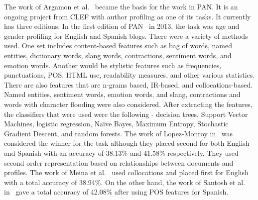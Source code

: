 \documentclass[a4paper]{llncs}
\begin{document}
The work of Argamon et al.~\cite{argamon2009automatically} became the basis for the work in PAN. It is an ongoing project from CLEF with author profiling as one of its tasks. It currently has three editions. In the first edition of PAN~\cite{rangel2013overview} in 2013, the task  was age and gender profiling for English and Spanish blogs. There were a variety of methods used. One set includes content-based features such as bag of words, named entities, dictionary words, slang words, contractions, sentiment words, and emotion words. Another would be stylistic features such as frequencies, punctuations, POS, HTML use, readability measures, and other various statistics. There are also features that are n-grams based, IR-based, and collocations-based. Named entities, sentiment words, emotion words, and slang, contractions and words with character flooding were also considered. After extracting the features, the classifiers that were used were the following - decision trees, Support Vector Machines, logistic regression, Naïve Bayes, Maximum Entropy, Stochastic Gradient Descent, and random forests. The work of Lopez-Monroy in~\cite{lopez2013inaoe} was considered the winner for the task although they placed second for both English and Spanish with an accuracy of 38.13\% and 41.58\% respectively. They used second order representation based on relationships between documents and profiles. The work of Meina et al.~\cite{meina2013ensemble} used collocations and placed first for English with a total accuracy of 38.94\%. On the other hand, the work of Santosh et al. in~\cite{santosh2013author} gave a total accuracy of 42.08\% after using POS features for Spanish.
\end{document}
